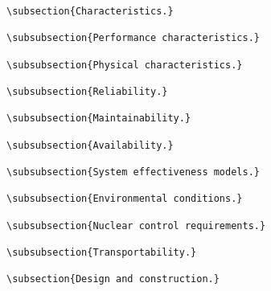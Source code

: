 \begin{itemize}
\begin{small}
\begin{verbatim}
\subsection{Characteristics.}

\subsubsection{Performance characteristics.}

\subsubsection{Physical characteristics.}

\subsubsection{Reliability.}

\subsubsection{Maintainability.}

\subsubsection{Availability.}

\subsubsection{System effectiveness models.}

\subsubsection{Environmental conditions.}

\subsubsection{Nuclear control requirements.}

\subsubsection{Transportability.}

\subsection{Design and construction.}


\end{verbatim}
\end{small}
\end{itemize}
